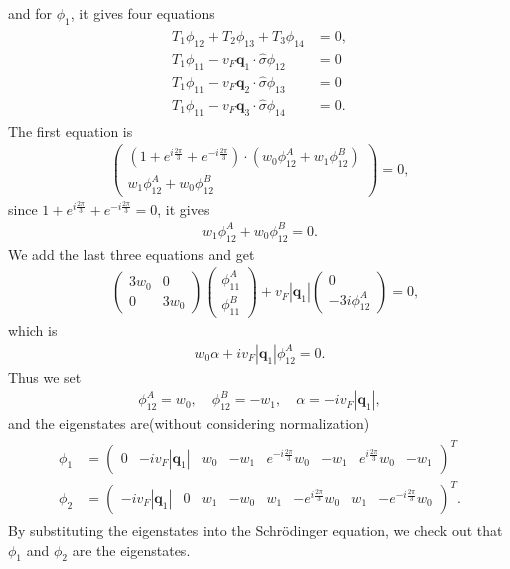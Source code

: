 \documentclass[10pt, oneside]{article}
\newcommand{\p}[1]{\left(#1\right)}
\begin{document}
and for \(\phi_1\), it gives four equations
\begin{align}
	\begin{split}
		T_{1} \phi_{12} + T_{2} \phi_{13} + T_{3} \phi_{14} &= 0, \\
		T_{1} \phi_{11} - v_F \bm{q}_{1} \cdot \hat{\sigma} \phi_{12} &= 0 \\
		T_{1} \phi_{11} - v_F \bm{q}_{2} \cdot \hat{\sigma} \phi_{13} &= 0 \\
		T_{1} \phi_{11} - v_F \bm{q}_{3} \cdot \hat{\sigma} \phi_{14} &= 0.
	\end{split}
\end{align}
The first equation is 
\begin{align}
	\begin{pmatrix}
		\p{1 + e^{i \frac{2 \pi}{3}} + e^{-i \frac{2 \pi}{3}}} \cdot \p{w_0 \phi_{12}^{A} + w_1 \phi_{12}^{B}} \\
		w_1 \phi_{12}^{A} + w_0 \phi_{12}^{B}
	\end{pmatrix} = 0,
\end{align}
since \(1 + e^{i \frac{2 \pi}{3}} + e^{-i \frac{2 \pi}{3}} = 0\), it gives
\begin{align}
	w_1 \phi_{12}^{A} + w_0 \phi_{12}^{B} = 0.
\end{align}
We add the last three equations and get 
\begin{align}
		&\begin{pmatrix}
			3 w_0 & 0 \\
			0 & 3 w_0
		\end{pmatrix} \begin{pmatrix}
			\phi_{11}^{A} \\ \phi_{11}^{B}
		\end{pmatrix} + v_F |\bm{q}_1| \begin{pmatrix}
			0 \\ -3i \phi_{12}^{A} 
		\end{pmatrix} = 0,
\end{align}
which is 
\begin{align}
	w_0 \alpha + i v_F|\bm{q}_{1}| \phi_{12}^{A} = 0. 
\end{align}
Thus we set 
\begin{align}
	\phi_{12}^{A} = w_0, \quad \phi_{12}^{B} = - w_1, \quad \alpha = - i v_F |\bm{q}_{1}|,
\end{align}
and the eigenstates are(without considering normalization)
\begin{align}
	\begin{split}
		\phi_1 &= \begin{pmatrix}
			0 & - i v_F |\bm{q}_{1}| & w_0 & - w_1 & e^{-i \frac{2 \pi}{3}} w_0 & - w_1 & e^{i \frac{2 \pi}{3}} w_0 & - w_1
		\end{pmatrix}^{T} \\
		\phi_2 &= \begin{pmatrix}
			- i v_F |\bm{q}_{1}| & 0 &  w_1 & - w_0 & w_1 & - e^{i \frac{2 \pi}{3}} w_0 & w_1 & - e^{-i \frac{2 \pi}{3}} w_0
		\end{pmatrix}^{T}.
	\end{split}
\end{align}
By substituting the eigenstates into the Schr\"odinger equation, we check out that \(\phi_1\) and \(\phi_2\) are the eigenstates.
\end{document}
